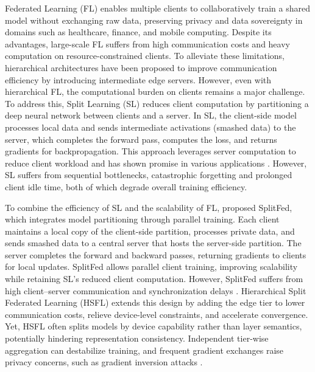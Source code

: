 \documentclass[letterpaper]{article} %
\begin{document}
    Federated Learning (FL) \cite{konečný2015federatedoptimizationdistributedoptimizationdatacenter, mcmahan2017communication} enables multiple clients to collaboratively train a shared model without exchanging raw data, preserving privacy and data sovereignty in domains such as healthcare, finance, and mobile computing. Despite its advantages, large-scale FL suffers from high communication costs and heavy computation on resource-constrained clients. To alleviate these limitations, hierarchical architectures have been proposed to improve communication efficiency by introducing intermediate edge servers. However, even with hierarchical FL, the computational burden on clients remains a major challenge. To address this, Split Learning (SL) \cite{GUPTA20181} reduces client computation by partitioning a deep neural network between clients and a server. In SL, the client-side model processes local data and sends intermediate activations (smashed data) to the server, which completes the forward pass, computes the loss, and returns gradients for backpropagation. This approach leverages server computation to reduce client workload and has shown promise in various applications \cite{vepakomma2019split, poirot2019split, li2023convergence}. However, SL suffers from sequential bottlenecks, catastrophic forgetting \cite{doi:10.1073/pnas.1611835114} and prolonged client idle time, both of which degrade overall training efficiency.


     To combine the efficiency of SL and the scalability of FL, \cite{thapa2022splitfed} proposed SplitFed, which integrates model partitioning through parallel training. Each client maintains a local copy of the client-side partition, processes private data, and sends smashed data to a central server that hosts the server-side partition. The server completes the forward and backward passes, returning gradients to clients for local updates. SplitFed allows parallel client training, improving scalability while retaining SL’s reduced client computation. However, SplitFed suffers from high client–server communication and synchronization delays \cite{thapa2022splitfed}. Hierarchical Split Federated Learning (HSFL) \cite{10980018} extends this design by adding the edge tier to lower communication costs, relieve device-level constraints, and accelerate convergence. Yet, HSFL often splits models by device capability rather than layer semantics, potentially hindering representation consistency. Independent tier-wise aggregation can destabilize training, and frequent gradient exchanges raise privacy concerns, such as gradient inversion attacks \cite{10025466, guo2025exploringvulnerabilitiesfederatedlearning}.
\end{document}
